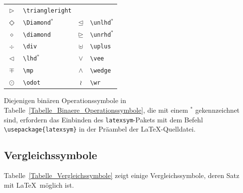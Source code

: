 \documentclass[a4paper,10pt,twoside]{scrbook}
\begin{document}
\begin{table}[h!tb]
\begin{tabular}{clcl}
$\triangleright$ & \texttt{\textbackslash triangleright} \\
$\Diamond$ & \texttt{\textbackslash Diamond$^\ast$} &
$\unlhd$ & \texttt{\textbackslash unlhd$^\ast$} \\
$\diamond$ & \texttt{\textbackslash diamond} &
$\unrhd$ & \texttt{\textbackslash unrhd$^\ast$} \\
$\div$ & \texttt{\textbackslash div} &
$\uplus$ & \texttt{\textbackslash uplus} \\
$\lhd$ & \texttt{\textbackslash lhd$^\ast$} &
$\vee$ & \texttt{\textbackslash vee} \\
$\mp$ & \texttt{\textbackslash mp} &
$\wedge$ & \texttt{\textbackslash wedge} \\
$\odot$ & \texttt{\textbackslash odot} &
$\wr$ & \texttt{\textbackslash wr} \\
\hline
\end{tabular}
\end{table}


Diejenigen binären Operationssymbole in Tabelle~\ref{Tabelle_Binaere_Operationssymbole}, die mit einem $^\ast$ gekennzeichnet sind,
erfordern das Einbinden des \verb!latexsym!-Pakets mit dem Befehl 
\verb!\usepackage{latexsym}! in der Präambel der \LaTeX-Quelldatei.


\subsection{Vergleichssymbole}

Tabelle~\ref{Tabelle_Vergleichssymbole} zeigt einige 
Vergleichssymbole, deren Satz mit \LaTeX\ möglich ist.
\end{document}
